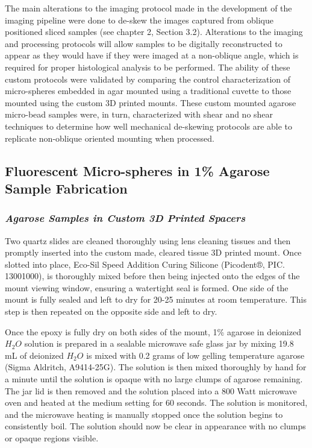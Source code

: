 The main alterations to the imaging protocol made in the development of the imaging pipeline were done to de-skew the images captured from oblique positioned sliced samples (see chapter 2, Section 3.2). Alterations to the imaging and processing protocols will allow samples to be digitally reconstructed to appear as they would have if they were imaged at a non-oblique angle, which is required for proper histological analysis to be performed. The ability of these custom protocols were validated by comparing the control characterization of micro-spheres embedded in agar mounted using a traditional cuvette to those mounted using the custom 3D printed mounts. These custom mounted agarose micro-bead samples were, in turn, characterized with shear and no shear techniques to determine how well mechanical de-skewing protocols are able to replicate non-oblique oriented mounting when processed. 


\subsection{Fluorescent Micro-spheres in 1\% Agarose Sample Fabrication} 

\subsubsection{\textit{Agarose Samples in Custom 3D Printed Spacers}}

Two quartz slides are cleaned thoroughly using lens cleaning tissues and then promptly inserted into the custom made, cleared tissue 3D printed mount. Once slotted into place, Eco-Sil Speed Addition Curing Silicone (Picodent®, PIC. 13001000), is thoroughly mixed before then being injected onto the edges of the mount viewing window, ensuring a watertight seal is formed. One side of the mount is fully sealed and left to dry for 20-25 minutes at room temperature. This step is then repeated on the opposite side and left to dry. 

Once the epoxy is fully dry on both sides of the mount, 1\% agarose in deionized $H_2O$ solution is prepared in a sealable microwave safe glass jar by mixing 19.8 mL of deionized $H_2O$ is mixed with 0.2 grams of low gelling temperature agarose (Sigma Aldritch, A9414-25G). The solution is then mixed thoroughly by hand for a minute until the solution is opaque with no large clumps of agarose remaining. The jar lid is then removed and the solution placed into a 800 Watt microwave oven and heated at the medium setting for 60 seconds. The solution is monitored, and the microwave heating is manually stopped once the solution begins to consistently boil. The solution should now be clear in appearance with no clumps or opaque regions visible.

